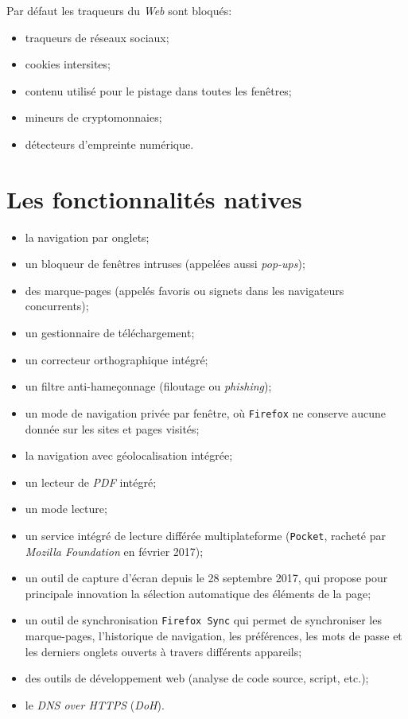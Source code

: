 \documentclass[a4paper,11pt]{book}
\begin{document}
Par défaut les traqueurs du \textit{Web} sont bloqués:
\begin{itemize}
	\item traqueurs de réseaux sociaux;
	\item cookies intersites;
	\item contenu utilisé pour le pistage dans toutes les fenêtres;
	\item mineurs de cryptomonnaies;
	\item détecteurs d’empreinte numérique.
\end{itemize} 
\medskip

\section*{Les fonctionnalités natives}
\begin{itemize}
	\item la navigation par onglets;
    \item un bloqueur de fenêtres intruses (appelées aussi \textit{pop-ups});
    \item des marque-pages (appelés \og favoris\fg{} ou \og signets\fg{} dans les navigateurs concurrents); 
    \item un gestionnaire de téléchargement;
    \item un correcteur orthographique intégré;
    \item un filtre anti-hameçonnage (\og filoutage\fg{} ou \textit{phishing});
    \item un mode de navigation privée par fenêtre, où \texttt{Firefox} ne conserve aucune donnée sur les sites et pages visités;
    \item la navigation avec géolocalisation intégrée;
    \item un lecteur de \textit{PDF} intégré;
    \item un mode lecture;
    \item un service intégré de lecture différée multiplateforme (\texttt{Pocket}, racheté par \textit{Mozilla Foundation} en février 2017);
    \item un outil de capture d'écran depuis le 28 septembre 2017, qui propose pour principale innovation la sélection automatique des éléments de la page;
    \item un outil de synchronisation \texttt{Firefox Sync} qui permet de synchroniser les marque-pages, l'historique de navigation, les préférences, les mots de passe et les derniers onglets ouverts à travers différents appareils;
    \item des outils de développement web (analyse de code source, script, etc.);
    \item le \textit{DNS over HTTPS} (\textit{DoH}).
\end{itemize}
\medskip
\end{document}
